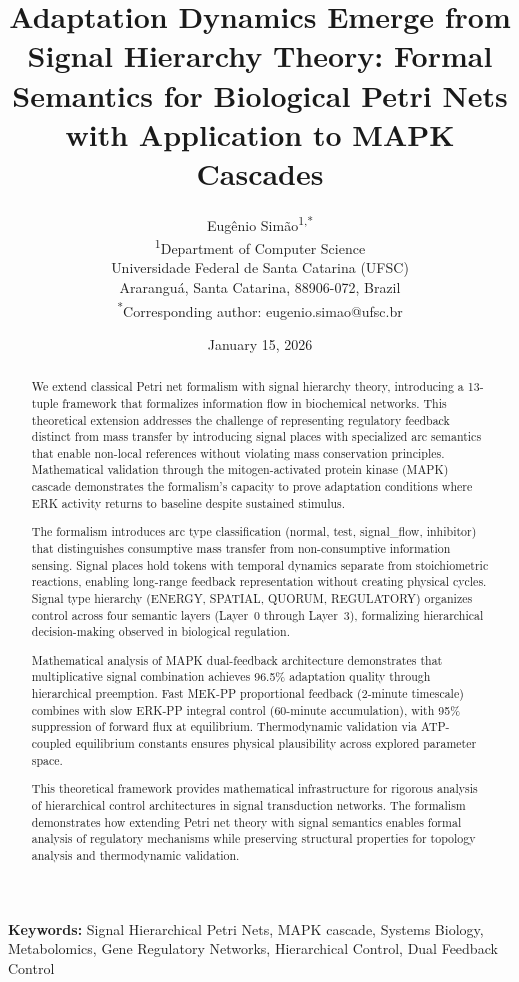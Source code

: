 \documentclass[twocolumn,11pt]{article}
\title{\textbf{Adaptation Dynamics Emerge from Signal Hierarchy Theory: Formal Semantics for Biological Petri Nets with Application to MAPK Cascades}}
\author{
Eugênio Simão\textsuperscript{1,*}\\
\textsuperscript{1}Department of Computer Science\\
Universidade Federal de Santa Catarina (UFSC)\\
Araranguá, Santa Catarina, 88906-072, Brazil\\
\textsuperscript{*}Corresponding author: eugenio.simao@ufsc.br
}
\date{January 15, 2026}
\begin{document}
\maketitle

\begin{abstract}
We extend classical Petri net formalism \citep{reisig2013} with signal hierarchy theory, introducing a 13-tuple framework that formalizes information flow in biochemical networks. This theoretical extension addresses the challenge of representing regulatory feedback distinct from mass transfer by introducing signal places with specialized arc semantics that enable non-local references without violating mass conservation principles. Mathematical validation through the mitogen-activated protein kinase (MAPK) cascade demonstrates the formalism's capacity to prove adaptation conditions where ERK activity returns to baseline despite sustained stimulus.

The formalism introduces arc type classification (normal, test, signal\_flow, inhibitor) that distinguishes consumptive mass transfer from non-consumptive information sensing. Signal places hold tokens with temporal dynamics separate from stoichiometric reactions, enabling long-range feedback representation without creating physical cycles. Signal type hierarchy (ENERGY, SPATIAL, QUORUM, REGULATORY) organizes control across four semantic layers (Layer~0 through Layer~3), formalizing hierarchical decision-making observed in biological regulation.

Mathematical analysis of MAPK dual-feedback architecture demonstrates that multiplicative signal combination achieves 96.5\% adaptation quality through hierarchical preemption. Fast MEK-PP proportional feedback (2-minute timescale) combines with slow ERK-PP integral control (60-minute accumulation), with 95\% suppression of forward flux at equilibrium. Thermodynamic validation via ATP-coupled equilibrium constants ensures physical plausibility across explored parameter space.

This theoretical framework provides mathematical infrastructure for rigorous analysis of hierarchical control architectures in signal transduction networks. The formalism demonstrates how extending Petri net theory with signal semantics enables formal analysis of regulatory mechanisms while preserving structural properties for topology analysis and thermodynamic validation.
\end{abstract}

\noindent\textbf{Keywords:} Signal Hierarchical Petri Nets, MAPK cascade, Systems Biology, Metabolomics, Gene Regulatory Networks, Hierarchical Control, Dual Feedback Control
\end{document}
